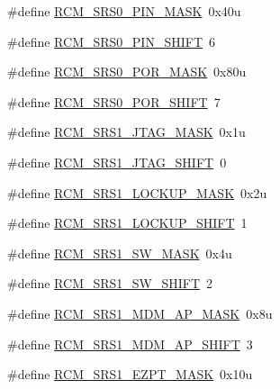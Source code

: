 \begin{DoxyCompactItemize}
\#define \hyperlink{group___r_c_m___register___masks_gab94707d2e91618c8c803dfa2d8df4e7b}{R\+C\+M\+\_\+\+S\+R\+S0\+\_\+\+P\+I\+N\+\_\+\+M\+A\+SK}~0x40u
\item 
\#define \hyperlink{group___r_c_m___register___masks_ga1c1ae6946300c9f33bf5575d45d2b862}{R\+C\+M\+\_\+\+S\+R\+S0\+\_\+\+P\+I\+N\+\_\+\+S\+H\+I\+FT}~6
\item 
\#define \hyperlink{group___r_c_m___register___masks_gad172e7645b5b6a0c5a2ff91db3087f7e}{R\+C\+M\+\_\+\+S\+R\+S0\+\_\+\+P\+O\+R\+\_\+\+M\+A\+SK}~0x80u
\item 
\#define \hyperlink{group___r_c_m___register___masks_ga98b995f8d56d338b315d6750072474ff}{R\+C\+M\+\_\+\+S\+R\+S0\+\_\+\+P\+O\+R\+\_\+\+S\+H\+I\+FT}~7
\item 
\#define \hyperlink{group___r_c_m___register___masks_ga636e5479adb4c5dba899a740ca14af5f}{R\+C\+M\+\_\+\+S\+R\+S1\+\_\+\+J\+T\+A\+G\+\_\+\+M\+A\+SK}~0x1u
\item 
\#define \hyperlink{group___r_c_m___register___masks_ga1184957c2244e1d98aed4a802ca8534d}{R\+C\+M\+\_\+\+S\+R\+S1\+\_\+\+J\+T\+A\+G\+\_\+\+S\+H\+I\+FT}~0
\item 
\#define \hyperlink{group___r_c_m___register___masks_ga4f7c4ce64c13c55fc0c7aaea3a702a03}{R\+C\+M\+\_\+\+S\+R\+S1\+\_\+\+L\+O\+C\+K\+U\+P\+\_\+\+M\+A\+SK}~0x2u
\item 
\#define \hyperlink{group___r_c_m___register___masks_ga71f857503a2b2d2e0c30d4762e89a8d8}{R\+C\+M\+\_\+\+S\+R\+S1\+\_\+\+L\+O\+C\+K\+U\+P\+\_\+\+S\+H\+I\+FT}~1
\item 
\#define \hyperlink{group___r_c_m___register___masks_ga72f541acd2a0992ad0d1d089c694ad5f}{R\+C\+M\+\_\+\+S\+R\+S1\+\_\+\+S\+W\+\_\+\+M\+A\+SK}~0x4u
\item 
\#define \hyperlink{group___r_c_m___register___masks_ga7e554c1ae96dae684fbc81204283f86c}{R\+C\+M\+\_\+\+S\+R\+S1\+\_\+\+S\+W\+\_\+\+S\+H\+I\+FT}~2
\item 
\#define \hyperlink{group___r_c_m___register___masks_ga6af4d8ed2135b602de575373f22b1af8}{R\+C\+M\+\_\+\+S\+R\+S1\+\_\+\+M\+D\+M\+\_\+\+A\+P\+\_\+\+M\+A\+SK}~0x8u
\item 
\#define \hyperlink{group___r_c_m___register___masks_ga91611da7546b27a939e92926f378229f}{R\+C\+M\+\_\+\+S\+R\+S1\+\_\+\+M\+D\+M\+\_\+\+A\+P\+\_\+\+S\+H\+I\+FT}~3
\item 
\#define \hyperlink{group___r_c_m___register___masks_gaaff7d7a53676535a98915b174b862435}{R\+C\+M\+\_\+\+S\+R\+S1\+\_\+\+E\+Z\+P\+T\+\_\+\+M\+A\+SK}~0x10u
\item 

\end{DoxyCompactItemize}
